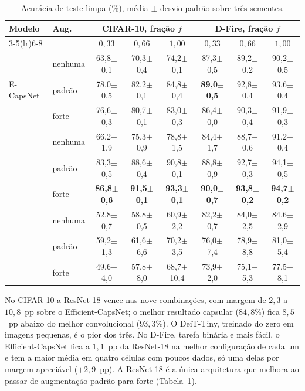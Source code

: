 \begin{table}[htb]
  \centering
  \caption{Acurácia de teste limpa (\%), média $\pm$ desvio padrão sobre três
  sementes.}
  \label{tab:res-clean}
  \footnotesize
  \setlength{\tabcolsep}{4pt}
  \begin{tabular}{llccc@{\hspace{12pt}}ccc}
    \toprule
    \multirow{2}{*}{Modelo} & \multirow{2}{*}{Aug.}
      & \multicolumn{3}{c}{CIFAR-10, fração $f$} & \multicolumn{3}{c}{D-Fire, fração $f$} \\
    \cmidrule(lr){3-5}\cmidrule(lr){6-8}
     & & $0{,}33$ & $0{,}66$ & $1{,}00$ & $0{,}33$ & $0{,}66$ & $1{,}00$ \\
    \midrule
    \multirow{3}{*}{E-CapsNet}
      & nenhuma & 63,8$\pm$0,1 & 70,3$\pm$0,4 & 74,2$\pm$0,1 & 87,3$\pm$0,5 & 89,2$\pm$0,2 & 90,2$\pm$0,5 \\
      & padrão  & 78,0$\pm$0,5 & 82,2$\pm$0,1 & 84,8$\pm$0,4 & \textbf{89,0$\pm$0,5} & 92,8$\pm$0,4 & 93,6$\pm$0,4 \\
      & forte   & 76,6$\pm$0,3 & 80,7$\pm$0,1 & 83,0$\pm$0,3 & 86,4$\pm$0,0 & 90,3$\pm$0,4 & 91,9$\pm$0,3 \\
    \addlinespace
    \multirow{3}{*}{ResNet-18}
      & nenhuma & 66,2$\pm$1,9 & 75,3$\pm$0,9 & 78,8$\pm$1,5 & 84,4$\pm$1,7 & 88,7$\pm$0,6 & 91,2$\pm$0,4 \\
      & padrão  & 83,3$\pm$0,5 & 88,6$\pm$0,4 & 90,8$\pm$0,1 & 88,8$\pm$0,9 & 92,7$\pm$0,3 & 94,1$\pm$0,5 \\
      & forte   & \textbf{86,8$\pm$0,6} & \textbf{91,5$\pm$0,1} & \textbf{93,3$\pm$0,1} & \textbf{90,0$\pm$0,7} & \textbf{93,8$\pm$0,2} & \textbf{94,7$\pm$0,2} \\
    \addlinespace
    \multirow{3}{*}{DeiT-Tiny}
      & nenhuma & 52,8$\pm$0,7 & 58,8$\pm$0,5 & 60,9$\pm$2,2 & 82,2$\pm$0,7 & 84,0$\pm$2,5 & 84,6$\pm$2,9 \\
      & padrão  & 59,2$\pm$1,3 & 61,6$\pm$6,6 & 70,2$\pm$3,5 & 76,0$\pm$7,4 & 78,9$\pm$8,8 & 81,0$\pm$5,4 \\
      & forte   & 49,6$\pm$4,0 & 57,8$\pm$8,0 & 68,7$\pm$10,4 & 73,9$\pm$2,0 & 75,1$\pm$5,3 & 77,5$\pm$8,1 \\
    \bottomrule
  \end{tabular}
\end{table}

No CIFAR-10 a ResNet-18 vence nas nove combinações, com margem de $2{,}3$ a
$10{,}8$~pp sobre o Efficient-CapsNet; o melhor resultado capsular ($84{,}8\%$)
fica $8{,}5$~pp abaixo do melhor convolucional ($93{,}3\%$). O DeiT-Tiny,
treinado do zero em imagens pequenas, é o pior dos três. No D-Fire, tarefa
binária e mais fácil, o Efficient-CapsNet fica a $1{,}1$~pp da ResNet-18 na
melhor configuração de cada um e tem a maior média em quatro células com poucos
dados, só uma delas por margem apreciável ($+2{,}9$~pp). A ResNet-18 é a única
arquitetura que melhora ao passar de augmentação padrão para forte
(Tabela~\ref{tab:res-clean}).

